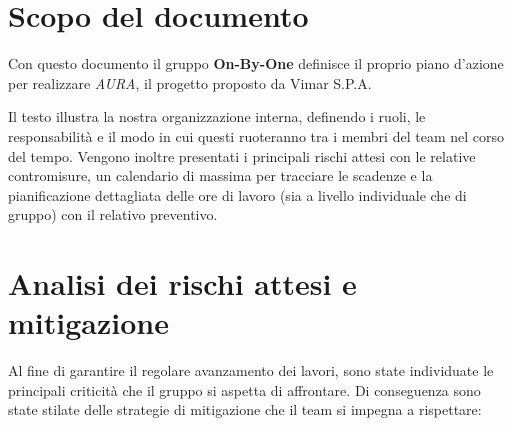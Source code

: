 \documentclass[11pt, a4paper]{article}
\begin{document}
\section{Scopo del documento}
Con questo documento il gruppo \textbf{On-By-One} definisce il proprio piano d'azione per realizzare \textit{AURA}, il progetto proposto da Vimar S.P.A.

\noindent
Il testo illustra la nostra organizzazione interna, definendo i ruoli, le responsabilità e il modo in cui questi ruoteranno tra i membri del team nel corso del tempo. Vengono inoltre presentati i principali rischi attesi con le relative contromisure, un calendario di massima per tracciare le scadenze e la pianificazione dettagliata delle ore di lavoro (sia a livello individuale che di gruppo) con il relativo preventivo.

\section{Analisi dei rischi attesi e mitigazione}

Al fine di garantire il regolare avanzamento dei lavori, sono state individuate le principali criticità che il gruppo si aspetta di affrontare. Di conseguenza sono state stilate delle strategie di mitigazione che il team si impegna a rispettare:
\end{document}
